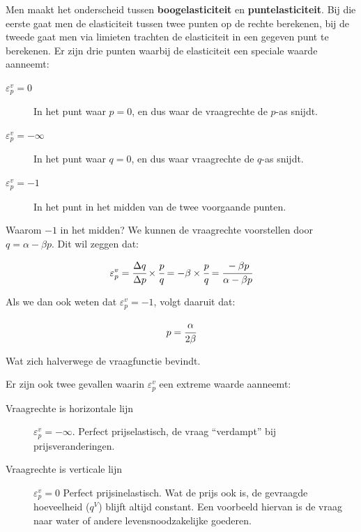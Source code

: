 Men maakt het onderscheid tussen \textbf{boogelasticiteit} en \textbf{puntelasticiteit}. Bij die eerste gaat men de elasticiteit tussen twee punten op de rechte berekenen, bij de tweede gaat men via limieten trachten de elasticiteit in een gegeven punt te berekenen. Er zijn drie punten waarbij de elasticiteit een speciale waarde aanneemt:
\begin{description}
	\item[$\varepsilon^{v}_{p} = 0$] In het punt waar $p=0$, en dus waar de vraagrechte de $p$-as snijdt.
    \item[$\varepsilon^{v}_{p} = -\infty$] In het punt waar $q=0$, en dus waar vraagrechte de $q$-as snijdt.
    \item[$\varepsilon^{v}_{p} = -1$] In het punt in het midden van de twee voorgaande punten.
\end{description}

Waarom $-1$ in het midden? We kunnen de vraagrechte voorstellen door $q= \alpha - \beta p$. Dit wil zeggen dat:

\begin{equation}
	\varepsilon^{v}_{p} =
    \cfrac{\Delta q}{\Delta p} \times \cfrac{p}{q} =
    -\beta \times \cfrac{p}{q} =
    \cfrac{-\beta p}{\alpha - \beta p}
\end{equation}

Als we dan ook weten dat $\varepsilon^{v}_{p} = -1$, volgt daaruit dat:

\begin{equation}
	p = \cfrac{\alpha}{2 \beta}
\end{equation}

Wat zich halverwege de vraagfunctie bevindt. 

Er zijn ook twee gevallen waarin $\varepsilon^{v}_{p}$ een extreme waarde aanneemt:
\begin{description}
	\item[Vraagrechte is horizontale lijn] $\varepsilon^{v}_{p} = -\infty$. Perfect prijselastisch, de vraag ``verdampt'' bij prijsveranderingen.
    \item[Vraagrechte is verticale lijn] $\varepsilon^{v}_{p} = 0$ Perfect prijsinelastisch. Wat de prijs ook is, de gevraagde hoeveelheid ($q^V$) blijft altijd constant. Een voorbeeld hiervan is de vraag naar water of andere levensnoodzakelijke goederen.
\end{description}


